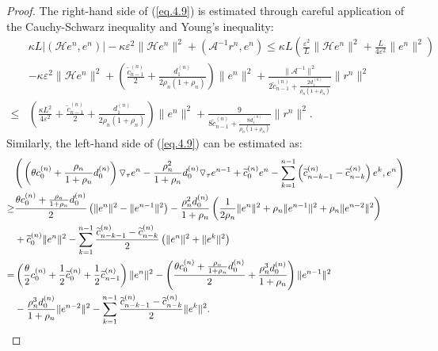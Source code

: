 \documentclass{siamart171218}
\theoremstyle{remark}
\theoremstyle{example}
\numberwithin{equation}{section}
\begin{document}
\begin{proof}
The right-hand side of (\ref{eq.4.9}) is estimated through careful application of the Cauchy-Schwarz inequality and Young's inequality:
	\begin{align*}
		& \kappa L|\left(\mathcal{H}e^n,e^n \right)|-\kappa \varepsilon^2 \|\mathcal{H} e^n \|^2
		+\left(\mathscr{A}^{-1}r^n, e^n\right)
		\leq  \kappa L\left(\frac{\varepsilon^2}{L}\|\mathcal{H} e^n\|^2+\frac{L} {4\varepsilon^2 }\|e^n\|^2 \right) \\
		&-\kappa \varepsilon^2 \|\mathcal{H} e^n \|^2+\left( \frac{\widetilde{c}_{n-1}^{(n)} }{2}+ \frac{ d_{1}^{(n)} }	{2\rho_{n}\left(1+\rho_{n} \right)}\right)\|e^n\|^2+\frac{\|\mathscr{A}^{-1}\|^2} {2\widetilde{c}_{n-1}^{(n)}+ \frac{2 d_{1}^{(n)} }	{\rho_{n}\left(1+\rho_{n} \right)} }\|r^n\|^2\\
		\leq&\left(\frac{\kappa L^2} {4\varepsilon^2 }+ \frac{\widetilde{c}_{n-1}^{(n)} }{2}+ \frac{ d_{1}^{(n)} }	{2\rho_{n}\left(1+\rho_{n} \right)}\right)\|e^n\|^2+\frac{9} {8\widetilde{c}_{n-1}^{(n)}+ \frac{8 d_{1}^{(n)} }	{\rho_{n}\left(1+\rho_{n} \right)} }\|r^n\|^2.
	\end{align*}
Similarly, the left-hand side of (\ref{eq.4.9}) can be estimated as:
\begin{align*}
		&\Bigg{(} \left( \theta c_{0}^{(n)}+  \frac{\rho_{n}}{1+\rho_{n}}d_{0}^{(n)} \right) \triangledown_\tau e^{n} -\frac{\rho_{n}^2}  {1+\rho_{n}}d_{0}^{(n)} \triangledown_\tau e^{n-1}  +\widetilde{c}_{0}^{(n)}  e^{n} -\sum\limits_{k=1}^{n-1} \left( \widetilde{c}_{n-k-1}^{(n)} -\widetilde{c}_{n-k}^{(n)} \right)  e^{k} ,e^n\Bigg{)}\\
		\ge &\frac{\theta c_{0}^{(n)}+  \frac{\rho_{n}}{1+\rho_{n}}d_{0}^{(n)}} {2}\left(\|e^n \|^2 -\|e^{n-1} \|^2\right)-\frac{\rho_{n}^2 d_{0}^{(n)}}{1+\rho_{n}}\left(\frac{1}{2\rho_{n}} \|e^n \|^2 +\rho_{n}\|e^{n-1} \|^2 +\rho_{n}\|e^{n-2} \|^2\right) \\ &+ \widetilde{c}_{0}^{(n)} \|e^n \|^2 -\sum\limits_{k=1}^{n-1}\frac{\widetilde{c}_{n-k-1}^{(n)} -\widetilde{c}_{n-k}^{(n)} }{2}\left(\|e^n \|^2+ \|e^k \|^2 \right) \\
		=&\left(\frac{\theta} {2}c_{0}^{(n)}+\frac{1 }{2}\widetilde{c}_{0}^{(n)} +\frac{1}{2}\widetilde{c}_{n-1}^{(n)}\right) \|e^n \|^2 -\left(\frac{\theta c_{0}^{(n)}+  \frac{\rho_{n}}{1+\rho_{n}}d_{0}^{(n)}} {2} +\frac{\rho_{n}^3 d_{0}^{(n)}}{1+\rho_{n}}\right)\|e^{n-1} \|^2\\
		&-\frac{\rho_{n}^3 d_{0}^{(n)}}{1+\rho_{n}} \|e^{n-2} \|^2
		-\sum\limits_{k=1}^{n-1}\frac{\widetilde{c}_{n-k-1}^{(n)} -\widetilde{c}_{n-k}^{(n)} }{2}\|e^k \|^2.

\end{align*}
\end{proof}
\end{document}
